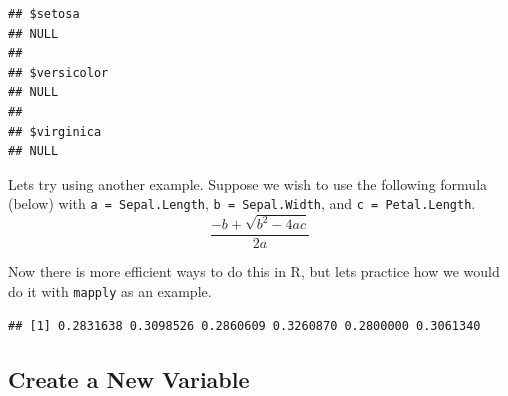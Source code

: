 \documentclass[
]{book}
\newenvironment{Shaded}{\begin{snugshade}}{\end{snugshade}}
\newcommand{\ControlFlowTok}[1]{\textcolor[rgb]{0.13,0.29,0.53}{\textbf{#1}}}
\newcommand{\DataTypeTok}[1]{\textcolor[rgb]{0.13,0.29,0.53}{#1}}
\newcommand{\DecValTok}[1]{\textcolor[rgb]{0.00,0.00,0.81}{#1}}
\newcommand{\KeywordTok}[1]{\textcolor[rgb]{0.13,0.29,0.53}{\textbf{#1}}}
\newcommand{\NormalTok}[1]{#1}
\newcommand{\OperatorTok}[1]{\textcolor[rgb]{0.81,0.36,0.00}{\textbf{#1}}}
\newcommand{\StringTok}[1]{\textcolor[rgb]{0.31,0.60,0.02}{#1}}
\begin{document}
\begin{verbatim}
## $setosa
## NULL
## 
## $versicolor
## NULL
## 
## $virginica
## NULL
\end{verbatim}

Lets try using another example. Suppose we wish to use the following formula (below) with \texttt{a\ =\ Sepal.Length}, \texttt{b\ =\ Sepal.Width}, and \texttt{c\ =\ Petal.Length}.
\[ \frac{-b + \sqrt{b^2-4ac} }{2a}\]

Now there is more efficient ways to do this in R, but lets practice how we would do it with \texttt{mapply} as an example.

\begin{Shaded}
\end{Shaded}

\begin{verbatim}
## [1] 0.2831638 0.3098526 0.2860609 0.3260870 0.2800000 0.3061340
\end{verbatim}

\hypertarget{create-a-new-variable}{%
\subsection{Create a New Variable}\label{create-a-new-variable}}
\end{document}
